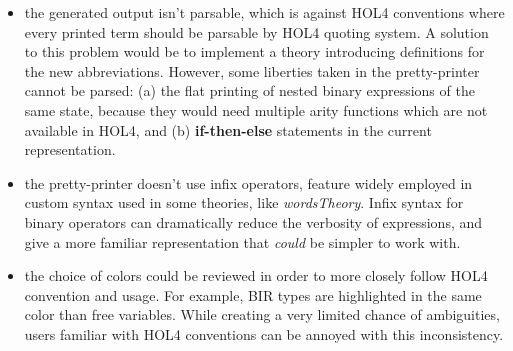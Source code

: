 \documentclass[10pt,a4paper]{article}
\begin{document}
\begin{multicols}{2}
\begin{itemize}
    \item the generated output isn't parsable, which is against HOL4 conventions where every printed term should be parsable by HOL4 quoting system. A solution to this problem would be to implement a theory introducing definitions for the new abbreviations. However, some liberties taken in the pretty-printer cannot be parsed: (a) the flat printing of nested binary expressions of the same state, because they would need multiple arity functions which are not available in HOL4, and (b) \textbf{if-then-else} statements in the current representation.
    \item the pretty-printer doesn't use infix operators, feature widely employed in custom syntax used in some theories, like \textit{wordsTheory}. Infix syntax for binary operators can dramatically reduce the verbosity of expressions, and give a more familiar representation that \textit{could} be simpler to work with.
    \item the choice of colors could be reviewed in order to more closely follow HOL4 convention and usage. For example, BIR types are highlighted in the same color than free variables. While creating a very limited chance of ambiguities, users familiar with HOL4 conventions can be annoyed with this inconsistency.
\end{itemize}


\end{multicols}
\end{document}
